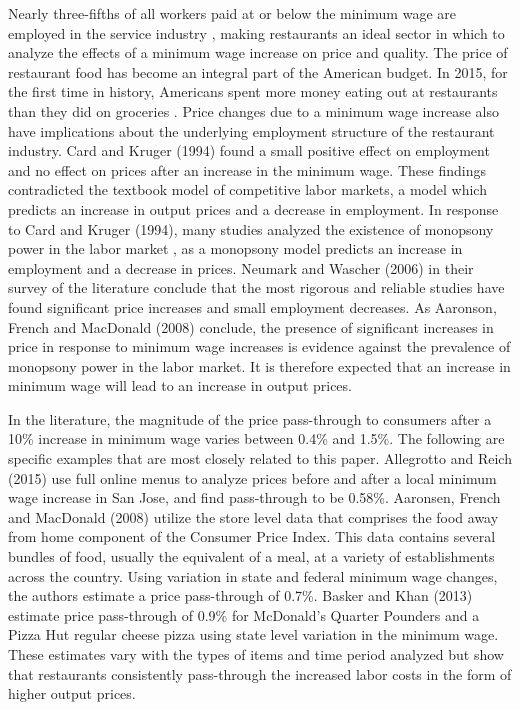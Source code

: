 \documentclass[11pt]{article}
\begin{document}
Nearly three-fifths of all workers paid at or below the minimum wage are employed in the service industry \cite{charsmw}, making restaurants an ideal sector in which to analyze the effects of a minimum wage increase on price and quality. The price of restaurant food has become an integral part of the American budget. In 2015, for the first time in history, Americans spent more money eating out at restaurants than they did on groceries \cite{usda}. 
Price changes due to a minimum wage increase also have implications about the underlying employment structure of the restaurant industry. Card and Kruger (1994) found a small positive effect on employment and no effect on prices after an increase in the minimum wage\nocite{card1994minimum}. These findings contradicted the textbook model of competitive labor markets, a model which predicts an increase in output prices and a decrease in employment. In response to Card and Kruger (1994), many studies analyzed the existence of monopsony power in the labor market \cite{manning1995we, rebitzer1995consequences, burdett1998wage, bhaskar1999minimum}, as a monopsony model predicts an increase in employment and a decrease in prices. Neumark and Wascher (2006)\nocite{neumark2006minimum} in their survey of the literature conclude that the most rigorous and reliable studies have found significant price increases and small employment decreases. As Aaronson, French and MacDonald (2008) conclude\nocite{aaronson2008minimum}, the presence of significant increases in price in response to minimum wage increases is evidence against the prevalence of monopsony power in the labor market. It is therefore expected that an increase in minimum wage will lead to an increase in output prices.


In the literature, the magnitude of the price pass-through to consumers after a 10\% increase in minimum wage varies between 0.4\% and 1.5\%. The following are specific examples that are most closely related to this paper. Allegrotto and Reich (2015) use full online menus to analyze prices before and after a local minimum wage increase in San Jose, and find pass-through to be 0.58\%\nocite{allegretto2015local}. Aaronsen, French and MacDonald (2008) utilize the store level data that comprises the food away from home component of the Consumer Price Index. This data contains several bundles of food, usually the equivalent of a meal, at a variety of establishments across the country. Using variation in state and federal minimum wage changes, the authors estimate a price pass-through of 0.7\%\nocite{aaronson2008minimum}. Basker and Khan (2013) estimate price pass-through of 0.9\% for McDonald's Quarter Pounders and a Pizza Hut regular cheese pizza using state level variation in the minimum wage\nocite{basker2016does}. These estimates vary with the types of items and time period analyzed but show that restaurants consistently pass-through the increased labor costs in the form of higher output prices. 
\end{document}
